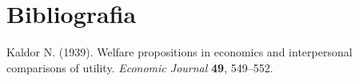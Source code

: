 \chapter*{Bibliografia}

\begin{references}
\item
Kaldor N. (1939). Welfare propositions in economics and interpersonal comparisons of utility.
\textit{Economic Journal} \textbf{49}, 549--552.


\end{references}

